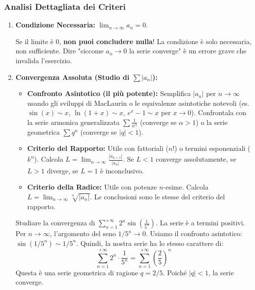 \subsubsection{Analisi Dettagliata dei Criteri}
\begin{enumerate}
    \item \textbf{Condizione Necessaria:} $\lim_{n \to \infty} a_n = 0$. 
    \begin{errore}
    Se il limite è 0, \textbf{non puoi concludere nulla}! La condizione è solo necessaria, non sufficiente. Dire "siccome $a_n \to 0$ la serie converge" è un errore grave che invalida l'esercizio. 
    \end{errore}

    \item \textbf{Convergenza Assoluta (Studio di $\sum |a_n|$):} 
    \begin{itemize}
        \item \textbf{Confronto Asintotico (il più potente):} Semplifica $|a_n|$ per $n \to \infty$ usando gli sviluppi di MacLaurin o le equivalenze asintotiche notevoli (es. $\sin(x) \sim x$, $\ln(1+x) \sim x$, $e^x-1 \sim x$ per $x \to 0$). Confrontala con la serie armonica generalizzata $\sum \frac{1}{n^\alpha}$ (converge se $\alpha > 1$) o la serie geometrica $\sum q^n$ (converge se $|q| < 1$). 
        \item \textbf{Criterio del Rapporto:} Utile con fattoriali ($n!$) o termini esponenziali ($k^n$). Calcola $L = \lim_{n \to \infty} \frac{|a_{n+1}|}{|a_n|}$. Se $L<1$ converge assolutamente, se $L>1$ diverge, se $L=1$ è inconclusivo. 
        \item \textbf{Criterio della Radice:} Utile con potenze $n$-esime. Calcola $L = \lim_{n \to \infty} \sqrt[n]{|a_n|}$. Le conclusioni sono le stesse del criterio del rapporto. 
    \end{itemize}
    
    \begin{esempio}
    Studiare la convergenza di $\sum_{n=1}^{+\infty} 2^n \sin\left(\frac{1}{5^n}\right)$.
    La serie è a termini positivi. Per $n \to \infty$, l'argomento del seno $1/5^n \to 0$. Usiamo il confronto asintotico: $\sin(1/5^n) \sim 1/5^n$. 
    Quindi, la nostra serie ha lo stesso carattere di:
    \[ \sum_{n=1}^{+\infty} 2^n \cdot \frac{1}{5^n} = \sum_{n=1}^{+\infty} \left(\frac{2}{5}\right)^n \]
    Questa è una serie geometrica di ragione $q=2/5$.  Poiché $|q|<1$, la serie converge. 
    \end{esempio}


\end{enumerate}
